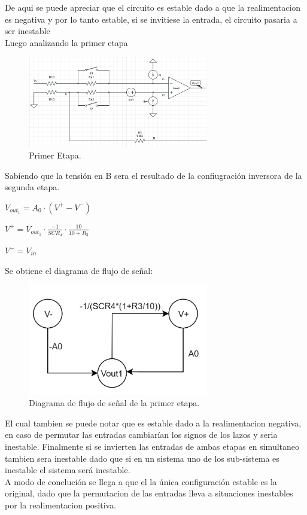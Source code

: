 De aqui se puede apreciar que el circuito es estable dado a que la realimentacion es negativa y por lo tanto estable, si se invitiese la entrada, el circuito pasaria a ser inestable\\
Luego analizando la primer etapa
\begin{figure}[H]	
	\centering
	\includegraphics[width=0.7\textwidth]{imagenes/PrimeraEtapa.PNG}
	\caption{Primer Etapa.}
	\label{fig:PrimerEtapa}
\end{figure}
Sabiendo que la tensión en B sera el resultado de la confiugración inversora de la segunda etapa.\\
\begin{center}$V_{out_1}=A_0 \cdot (V^+ - V^-)$\\\end{center}
\begin{center}$V^+= V_{out_1}\cdot \frac{-1}{SCR_4} \cdot \frac{10}{10+R_3} $\\\end{center}
\begin{center}$V^- = V_{in}$\\\end{center}
Se obtiene el diagrama de flujo de señal:
\begin{figure}[H]	
	\centering
	\includegraphics[width=0.7\textwidth]{imagenes/PrimerEtapaDiagrama.PNG}
	\caption{Diagrama de flujo de señal de la primer etapa.}
	\label{fig:PrimerEtapaDiagrama}
\end{figure}
El cual tambien se puede notar que es estable dado a la realimentacion negativa, en caso de permutar las entradas cambiarían los signos de los lazos y seria inestable.
Finalmente si se invierten las entradas de ambas etapas en simultaneo tambien sera inestable dado que si en un sistema uno de los sub-sistema es inestable el sistema será inestable.\\
A modo de conclución se llega a que el la única configuración estable es la original, dado que la permutacion de las entradas lleva a situaciones inestables por la realimentacion positiva.
